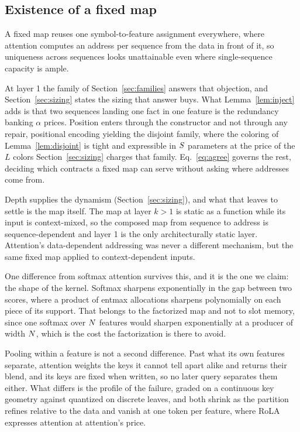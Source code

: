 \subsection{Existence of a fixed map}
\label{sec:router}

A fixed map reuses one symbol-to-feature assignment everywhere, where attention computes an address per sequence from the data in front of it, so uniqueness across sequences looks unattainable even where single-sequence capacity is ample.

At layer 1 the family of Section~\ref{sec:families} answers that objection, and Section~\ref{sec:sizing} states the sizing that answer buys. What Lemma~\ref{lem:inject} adds is that two sequences landing one fact in one feature is the redundancy banking $\alpha$ prices. Position enters through the constructor and not through any repair, positional encoding yielding the disjoint family, where the coloring of Lemma~\ref{lem:disjoint} is tight and expressible in $S$ parameters at the price of the $L$ colors Section~\ref{sec:sizing} charges that family. Eq.~\eqref{eq:agree} governs the rest, deciding which contracts a fixed map can serve without asking where addresses come from.

Depth supplies the dynamism (Section~\ref{sec:sizing}), and what that leaves to settle is the map itself. The map at layer $k > 1$ is static as a function while its input is context-mixed, so the composed map from sequence to address is sequence-dependent and layer 1 is the only architecturally static layer. Attention's data-dependent addressing was never a different mechanism, but the same fixed map applied to context-dependent inputs.

One difference from softmax attention survives this, and it is the one we claim: the shape of the kernel. Softmax sharpens exponentially in the gap between two scores, where a product of entmax allocations sharpens polynomially on each piece of its support. That belongs to the factorized map and not to slot memory, since one softmax over $N$ features would sharpen exponentially at a producer of width $N$, which is the cost the factorization is there to avoid.

Pooling within a feature is not a second difference. Past what its own features separate, attention weights the keys it cannot tell apart alike and returns their blend, and its keys are fixed when written, so no later query separates them either. What differs is the profile of the failure, graded on a continuous key geometry against quantized on discrete leaves, and both shrink as the partition refines relative to the data and vanish at one token per feature, where RoLA expresses attention at attention's price.

